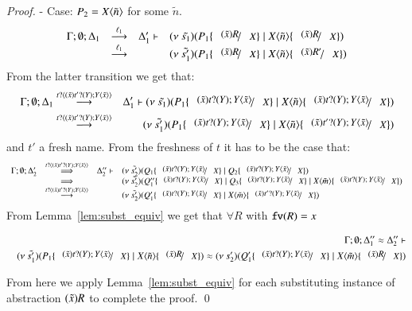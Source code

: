 \begin{proof}
	\noi - Case: $P_2 = X\langle \tilde{n} \rangle$ for some $\tilde{n}$.
%
	\[
	\begin{array}{rcll}
		\Gamma; \es; \Delta_1 &\by{\ell_1}& \Delta_1' \proves& \newsp{\tilde{s_1}}{P_1 \subst{(\tilde{x}) R}{X} \Par \appl{X}{\tilde{n}} \subst{(\tilde{x}) R}{X}}\\
		&\by{\ell_1} & & \newsp{\tilde{s_1'}}{P_1 \subst{(\tilde{x}) R}{X} \Par \appl{X}{\tilde{n}} \subst{(\tilde{x}) R'}{X}}
	\end{array}
	\]
%
	\noi From the latter transition we get that:
%
	\begin{eqnarray}
		\Gamma; \es; \Delta_1 &\by{\bactinp{t}{(\tilde{x}) \binp{t'}{Y} \appl{Y}{\tilde{x}}}}& \Delta_1' \proves \newsp{\tilde{s_1}}{P_1 \subst{(\tilde{x}) \binp{t}{Y} \appl{Y}{\tilde{x}}}{X} \Par \appl{X}{\tilde{n}} \subst{(\tilde{x}) \binp{t}{Y} \appl{Y}{\tilde{x}}}{X}} \nonumber \\
		&\by{\bactinp{t}{(\tilde{x}) \binp{t'}{Y} \appl{Y}{\tilde{x}}}}& 
		\newsp{\tilde{s_1'}}{P_1 \subst{(\tilde{x}) \binp{t}{Y} \appl{Y}{\tilde{x}}}{X} \Par \appl{X}{\tilde{n}} \subst{(\tilde{x}) \binp{t'}{Y} \appl{Y}{\tilde{x}}}{X}}
		\label{cor:subst_equiv5}
	\end{eqnarray}
%
	\noi and $t'$ a fresh name. From the freshness of $t$
	it has to be the case that:
%
\[
	\begin{array}{rcll}
		\Gamma; \es; \Delta_2' &\By{\bactinp{t}{(\tilde{x}) \binp{t'}{Y} \appl{Y}{\tilde{x}}}}& \Delta_2'' \proves &
		\newsp{\tilde{s_2'}}{Q_1 \subst{(\tilde{x}) \binp{t}{Y} \appl{Y}{\tilde{x}}}{X} \Par Q_2 \subst{(\tilde{x}) \binp{t}{Y} \appl{Y}{\tilde{x}}}{X}}\\
		&\By{}& &
		\newsp{\tilde{s_2'}}{Q_1'' \subst{(\tilde{x}) \binp{t}{Y} \appl{Y}{\tilde{x}}}{X} \Par Q_3 \subst{(\tilde{x}) \binp{t}{Y} \appl{Y}{\tilde{x}}}{X} \Par \appl{X}{\tilde{m}} \subst{(\tilde{x})\binp{t}{Y} \appl{Y}{\tilde{x}}}{X}} \\
		&\by{\bactinp{t}{(\tilde{x}) \binp{t'}{Y} \appl{Y}{\tilde{x}}}}& &
		\newsp{\tilde{s_2'}}{Q_1'\subst{(\tilde{x}) \binp{t}{Y} \appl{Y}{\tilde{x}}}{X} \Par \appl{X}{\tilde{m}} \subst{(\tilde{x})\binp{t'}{Y} \appl{Y}{\tilde{x}}}{X}} \\
	\end{array}
\]
%
	\noi From Lemma~\ref{lem:subst_equiv} we get that $\forall R$ with $\mathtt{fv}(R) = x$

	\begin{eqnarray}
		&&\Gamma; \es; \Delta_1'' \wb \Delta_2'' \proves \nonumber \\
		&&\newsp{\tilde{s_1'}}{P_1 \subst{(\tilde{x}) \binp{t}{Y} \appl{Y}{\tilde{x}}}{X} \Par \appl{X}{\tilde{n}} \subst{(\tilde{x}) R}{X}} \wb \newsp{s_2'}{Q_1' \subst{(\tilde{x}) \binp{t}{Y} \appl{Y}{\tilde{x}}}{X} \Par \appl{X}{\tilde{m}} \subst{(\tilde{x}) R}{X}}
		\label{cor:subst_equiv6}
	\end{eqnarray} 

	\noi From here we apply Lemma~\ref{lem:subst_equiv} for each substituting instance of
	abstraction $(\tilde{x})R$ to complete the proof.
	\qed
\end{proof}

